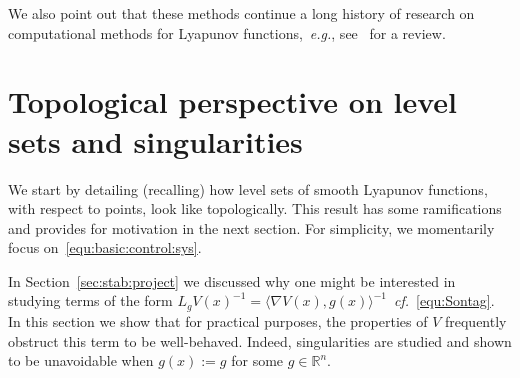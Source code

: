 \documentclass[letterpaper, 10 pt, conference]{ieeeconf}  %
\theoremstyle{mystyle}
\begin{document}
We also point out that these methods continue a long history of research on computational methods for Lyapunov functions,~\textit{e.g.}, see~\cite{ref:giesl2015review} for a review.  

\section{Topological perspective on level sets and singularities}
\label{sec:topo}
We start by detailing (recalling) how level sets of smooth Lyapunov functions, with respect to points, look like topologically. This result has some ramifications and provides for motivation in the next section.  
For simplicity, we momentarily focus on~\eqref{equ:basic:control:sys}.

In Section~\ref{sec:stab:project} we discussed why one might be interested in studying terms of the form $L_gV(x)^{-1}=\langle \nabla V(x), g(x) \rangle^{-1}$~\textit{cf.}~\eqref{equ:Sontag}. In this section we show that for practical purposes, the properties of $V$ frequently obstruct this term to be well-behaved. Indeed, singularities are studied and shown to be unavoidable when $g(x):=g$ for some $g\in \mathbb{R}^n$. 
\end{document}

